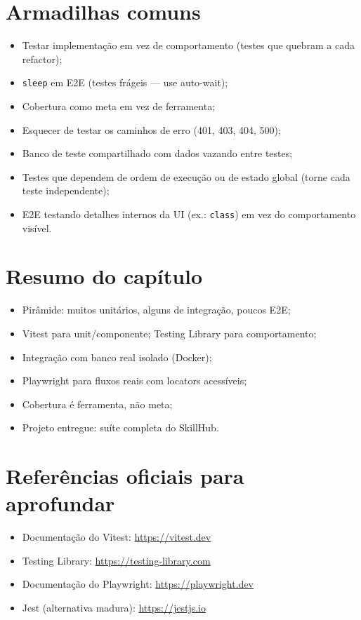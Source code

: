 \section{Armadilhas comuns}

\begin{itemize}[leftmargin=*, itemsep=0.4em]
  \item Testar implementação em vez de comportamento (testes que quebram a cada refactor);
  \item \texttt{sleep} em E2E (testes frágeis — use auto-wait);
  \item Cobertura como meta em vez de ferramenta;
  \item Esquecer de testar os caminhos de erro (401, 403, 404, 500);
  \item Banco de teste compartilhado com dados vazando entre testes;
  \item Testes que dependem de ordem de execução ou de estado global (torne cada teste independente);
  \item E2E testando detalhes internos da UI (ex.: \texttt{class}) em vez do comportamento visível.
\end{itemize}

\section{Resumo do capítulo}

\begin{itemize}[leftmargin=*, itemsep=0.3em]
  \item Pirâmide: muitos unitários, alguns de integração, poucos E2E;
  \item Vitest para unit/componente; Testing Library para comportamento;
  \item Integração com banco real isolado (Docker);
  \item Playwright para fluxos reais com locators acessíveis;
  \item Cobertura é ferramenta, não meta;
  \item Projeto entregue: suíte completa do SkillHub.
\end{itemize}

\section{Referências oficiais para aprofundar}

\begin{itemize}[leftmargin=*, itemsep=0.3em]
  \item Documentação do Vitest: \url{https://vitest.dev}
  \item Testing Library: \url{https://testing-library.com}
  \item Documentação do Playwright: \url{https://playwright.dev}
  \item Jest (alternativa madura): \url{https://jestjs.io}
\end{itemize}
